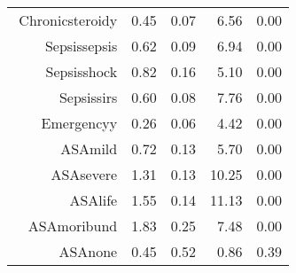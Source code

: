 \begin{tabular}{rrrrr}
$$  Chronic\-steroid\-y & 0.45 & 0.07 & 6.56 & 0.00 \\ 
  Sepsis\-sepsis & 0.62 & 0.09 & 6.94 & 0.00 \\ 
  Sepsis\-shock & 0.82 & 0.16 & 5.10 & 0.00 \\ 
  Sepsis\-sirs & 0.60 & 0.08 & 7.76 & 0.00 \\ 
  Emergency\-y & 0.26 & 0.06 & 4.42 & 0.00 \\ 
  ASA\-mild & 0.72 & 0.13 & 5.70 & 0.00 \\ 
  ASA\-severe & 1.31 & 0.13 & 10.25 & 0.00 \\ 
  ASA\-life & 1.55 & 0.14 & 11.13 & 0.00 \\ 
  ASA\-moribund & 1.83 & 0.25 & 7.48 & 0.00 \\ 
  ASA\-none & 0.45 & 0.52 & 0.86 & 0.39 \\ 
   \hline
\end{tabular}

